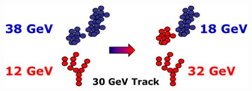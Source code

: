 \documentclass[8pt]{beamer}
\begin{document}
\begin{frame}
\begin{minipage}{0.37\linewidth}
\begin{center}
{        \includegraphics[width=\linewidth]{PandoraReclustering-MergeSplit.pdf}
        }
      \end{center}
    \end{minipage}
  \end{frame}
  \endgroup
\end{document}
